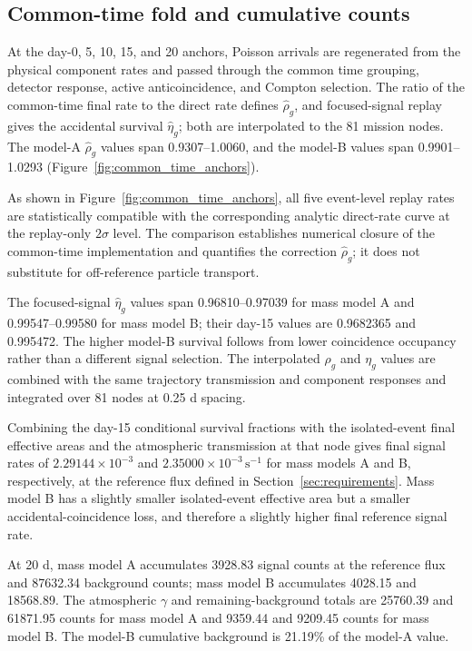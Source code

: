\documentclass[11pt]{article}
\newcommand{\cps}{\ensuremath{\,\mathrm{s^{-1}}}}
\begin{document}
\FloatBarrier

\subsection{Common-time fold and cumulative counts}
\label{subsec:mission_fold_validation}

At the day-0, 5, 10, 15, and 20 anchors, Poisson arrivals are regenerated from the physical component rates and passed through the common time grouping, detector response, active anticoincidence, and Compton selection. The ratio of the common-time final rate to the direct rate defines $\widehat\rho_g$, and focused-signal replay gives the accidental survival $\widehat\eta_g$; both are interpolated to the 81 mission nodes. The model-A $\widehat\rho_g$ values span 0.9307--1.0060, and the model-B values span 0.9901--1.0293 (Figure~\ref{fig:common_time_anchors}).

As shown in Figure~\ref{fig:common_time_anchors}, all five event-level replay
rates are statistically compatible with the corresponding analytic direct-rate
curve at the replay-only $2\sigma$ level. The comparison establishes numerical
closure of the common-time implementation and quantifies the correction
$\widehat\rho_g$; it does not substitute for off-reference particle transport.

The focused-signal $\widehat\eta_g$ values span 0.96810--0.97039 for mass model A and 0.99547--0.99580 for mass model B; their day-15 values are 0.9682365 and 0.995472. The higher model-B survival follows from lower coincidence occupancy rather than a different signal selection. The interpolated $\rho_g$ and $\eta_g$ values are combined with the same trajectory transmission and component responses and integrated over 81 nodes at 0.25 d spacing.

Combining the day-15 conditional survival fractions with the isolated-event final effective areas and the atmospheric transmission at that node gives final signal rates of $2.29144\times10^{-3}$ and $2.35000\times10^{-3}\cps$ for mass models A and B, respectively, at the reference flux defined in Section~\ref{sec:requirements}. Mass model B has a slightly smaller isolated-event effective area but a smaller accidental-coincidence loss, and therefore a slightly higher final reference signal rate.

At 20 d, mass model A accumulates 3928.83 signal counts at the reference flux
and 87632.34 background counts; mass model B accumulates 4028.15 and 18568.89.
The atmospheric $\gamma$ and remaining-background totals are
25760.39 and 61871.95 counts for mass model A and 9359.44 and 9209.45 counts for
mass model B. The model-B cumulative background is 21.19\% of the model-A
value.
\end{document}
